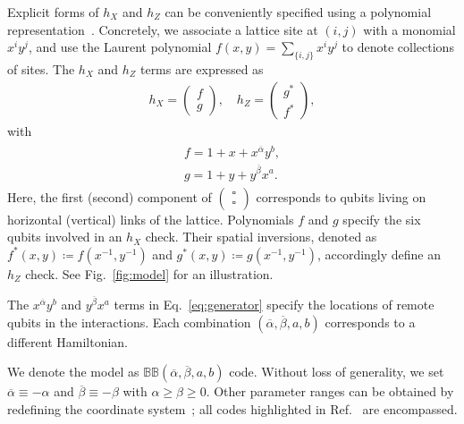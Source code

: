 \documentclass[aps,prl,english,superscriptaddress,twocolumn,tightenlines,showpacs,longbibliography,floatfix,amsfonts]{revtex4-2}
\begin{document}
	Explicit forms of $h_X$ and $h_Z$ can be conveniently specified using a polynomial representation~\cite{Haah13}.
	Concretely, we associate a lattice site at $(i,j)$ with a monomial $x^i y^j$, and use the Laurent polynomial $f(x,y) = \sum_{\{i, j\}} x^i y^j$ to denote collections of sites.
	The $h_X$ and $h_Z$ terms are expressed as
	\begin{align}\label{eq:checks}
		h_X = \begin{pmatrix} 
			f \\  g
		\end{pmatrix}, 
		\quad
		h_Z = \begin{pmatrix} 
			g^\ast \\  f^\ast
		\end{pmatrix},
	\end{align}
	with
	\begin{gather}\label{eq:generator}
		\begin{aligned}
			f = 1+x + x^{\overline{\alpha}} y^b, \\
			g = 1+y + y^{\overline{\beta}} x^a.
		\end{aligned}
	\end{gather}
	Here, the first (second) component of 
	$\left(\begin{smallmatrix}
		\square \\ \square 
	\end{smallmatrix}\right)$
	corresponds to qubits living on horizontal (vertical) links of the lattice.
	Polynomials $f$ and $g$ specify the six qubits involved in an $h_X$ check.
	Their spatial inversions, denoted as  $f^\ast (x,y) \coloneqq f(x^{-1}, y^{-1})$ and 
	$g^\ast (x,y) \coloneqq g(x^{-1}, y^{-1})$, accordingly define an $h_Z$ check.
	See Fig.~\ref{fig:model} for an illustration.
	
	
	The $x^{\overline{\alpha}} y^b$ and $y^{\overline{\beta}} x^a$ terms in Eq.~\eqref{eq:generator} specify the locations of remote qubits in the interactions.
	Each combination $(\overline{\alpha}, \overline{\beta}, a, b)$ corresponds to a different Hamiltonian.
	
	We denote the model as $\mathbb{BB}(\overline{\alpha}, \overline{\beta}, a, b)$ code. Without loss of generality, we set $\overline{\alpha}\equiv-\alpha$ and $\overline{\beta}\equiv-\beta$ with $\alpha \geq \beta\geq0$. 
	Other parameter ranges can be obtained by redefining the coordinate system~\cite{SM1};  
	all codes highlighted in Ref.~\cite{Bravyi24} are encompassed.
	
\end{document}
